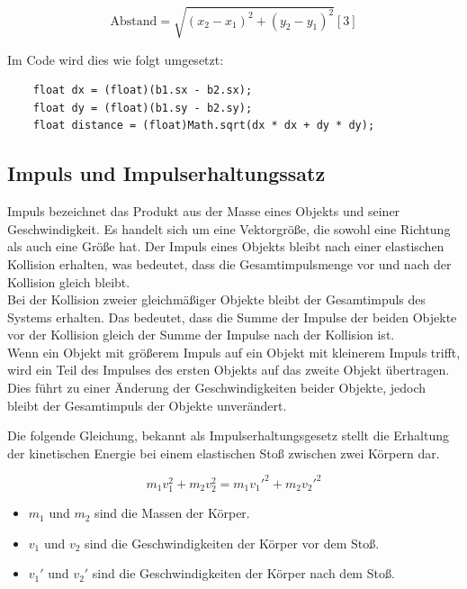 \documentclass[12pt,a4paper]{article}
\begin{document}
\[
\text{Abstand} = \sqrt{(x_2 - x_1)^2 + (y_2 - y_1)^2} [3]
\]

Im Code wird dies wie folgt umgesetzt:

\begin{verbatim}
	float dx = (float)(b1.sx - b2.sx);
	float dy = (float)(b1.sy - b2.sy);
	float distance = (float)Math.sqrt(dx * dx + dy * dy);
\end{verbatim}





\subsection{Impuls und Impulserhaltungssatz}

Impuls bezeichnet das Produkt aus der Masse eines Objekts und seiner Geschwindigkeit. Es handelt sich um eine Vektorgröße, die sowohl eine Richtung als auch eine Größe hat. Der Impuls eines Objekts bleibt nach einer elastischen Kollision erhalten, was bedeutet, dass die Gesamtimpulsmenge vor und nach der Kollision gleich bleibt.\\
Bei der Kollision zweier gleichmäßiger Objekte bleibt der Gesamtimpuls des Systems erhalten. Das bedeutet, dass die Summe der Impulse der beiden Objekte vor der Kollision gleich der Summe der Impulse nach der Kollision ist.\\
Wenn ein Objekt mit größerem Impuls auf ein Objekt mit kleinerem Impuls trifft, wird ein Teil des Impulses des ersten Objekts auf das zweite Objekt übertragen. Dies führt zu einer Änderung der Geschwindigkeiten beider Objekte, jedoch bleibt der Gesamtimpuls der Objekte unverändert.


	\vspace{0.5cm}

Die folgende Gleichung, bekannt als Impulserhaltungsgesetz stellt die Erhaltung der kinetischen Energie bei einem elastischen Stoß zwischen zwei Körpern dar.
		
		\[
		m_1 v_1^2 +  m_2 v_2^2 =  m_1 v_1'^2 +  m_2 v_2'^2
		\]
		
		\begin{itemize}
			\item \( m_1 \) und \( m_2 \) sind die Massen der Körper.
			\item \( v_1 \) und \( v_2 \) sind die Geschwindigkeiten der Körper vor dem Stoß.
			\item \( v_1' \) und \( v_2' \) sind die Geschwindigkeiten der Körper nach dem Stoß.
		\end{itemize}
		\vspace{0.5cm}
		
\end{document}
